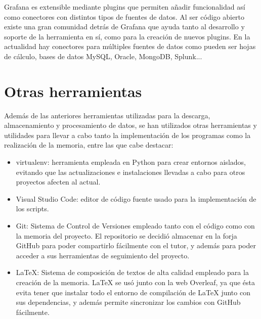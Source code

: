Grafana es extensible mediante plugins que permiten añadir funcionalidad así como conectores con distintos tipos de fuentes de datos. Al ser código abierto existe una gran comunidad detrás de Grafana que ayuda tanto al desarrollo y soporte de la herramienta en sí, como para la creación de nuevos plugins. En la actualidad hay conectores para múltiples fuentes de datos como pueden ser hojas de cálculo, bases de datos MySQL, Oracle, MongoDB, Splunk...

\section{Otras herramientas}

Además de las anteriores herramientas utilizadas para la descarga, almacenamiento y procesamiento de datos, se han utilizados otras herramientas y utilidades para llevar a cabo tanto la implementación de los programas como la realización de la memoria, entre las que cabe destacar:

\begin{itemize}
    \item virtualenv: herramienta empleada en Python para crear entornos aislados, evitando que las actualizaciones e instalaciones llevadas a cabo para otros proyectos afecten al actual.
    \item Visual Studio Code: editor de código fuente usado para la implementación de los scripts.
    \item Git: Sistema de Control de Versiones empleado tanto con el código como con la memoria del proyecto. El repositorio se decidió almacenar en la forja GitHub para poder compartirlo fácilmente con el tutor, y además para poder acceder a sus herramientas de seguimiento del proyecto.
    \item \LaTeX: Sistema de composición de textos de alta calidad empleado para la creación de la memoria. LaTeX se usó junto con la web Overleaf, ya que ésta evita tener que instalar todo el entorno de compilación de LaTeX junto con sus dependencias, y además permite sincronizar los cambios con GitHub fácilmente.
\end{itemize}
